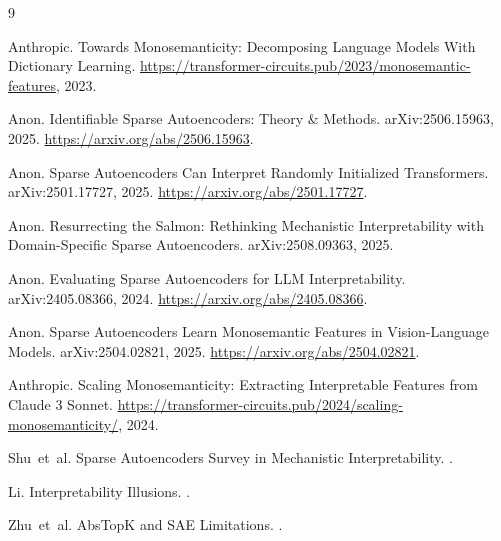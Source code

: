 \documentclass{article}
\begin{document}

\begin{thebibliography}{9}

Anthropic.
\newblock Towards Monosemanticity: Decomposing Language Models With Dictionary Learning.
\newblock \url{https://transformer-circuits.pub/2023/monosemantic-features}, 2023.

Anon.
\newblock Identifiable Sparse Autoencoders: Theory \& Methods.
\newblock arXiv:2506.15963, 2025.
\url{https://arxiv.org/abs/2506.15963}.

Anon.
\newblock Sparse Autoencoders Can Interpret Randomly Initialized Transformers.
\newblock arXiv:2501.17727, 2025.
\url{https://arxiv.org/abs/2501.17727}.

Anon.
\newblock Resurrecting the Salmon: Rethinking Mechanistic Interpretability with Domain-Specific Sparse Autoencoders.
\newblock arXiv:2508.09363, 2025.

Anon.
\newblock Evaluating Sparse Autoencoders for LLM Interpretability.
\newblock arXiv:2405.08366, 2024.
\url{https://arxiv.org/abs/2405.08366}.

Anon.
\newblock Sparse Autoencoders Learn Monosemantic Features in Vision-Language Models.
\newblock arXiv:2504.02821, 2025.
\url{https://arxiv.org/abs/2504.02821}.

Anthropic.
\newblock Scaling Monosemanticity: Extracting Interpretable Features from Claude 3 Sonnet.
\newblock \url{https://transformer-circuits.pub/2024/scaling-monosemanticity/}, 2024.

Shu~et~al.
\newblock Sparse Autoencoders Survey in Mechanistic Interpretability.
.

Li.
\newblock Interpretability Illusions.
.

Zhu~et~al.
\newblock AbsTopK and SAE Limitations.
.

\end{thebibliography}
\end{document}

